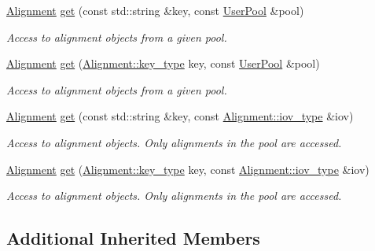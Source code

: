 \begin{DoxyCompactItemize}
\hyperlink{class_d_d4hep_1_1_alignments_1_1_alignment}{Alignment} \hyperlink{class_d_d4hep_1_1_alignments_1_1_det_align_a1487afd0d23a2ce523b29c7e502bf0bd}{get} (const std\+::string \&key, const \hyperlink{class_d_d4hep_1_1_alignments_1_1_det_align_a0595e4c0ee7f454cf5e9c5d32b718aca}{User\+Pool} \&pool)
\begin{DoxyCompactList}\small\item\em Access to alignment objects from a given pool. \end{DoxyCompactList}\item 
\hyperlink{class_d_d4hep_1_1_alignments_1_1_alignment}{Alignment} \hyperlink{class_d_d4hep_1_1_alignments_1_1_det_align_a25f066eaf3999061359f7a46fbd4cfe1}{get} (\hyperlink{class_d_d4hep_1_1_alignments_1_1_alignment_ab824a65f935a0c79b9ea1a7a85014b88}{Alignment\+::key\+\_\+type} key, const \hyperlink{class_d_d4hep_1_1_alignments_1_1_det_align_a0595e4c0ee7f454cf5e9c5d32b718aca}{User\+Pool} \&pool)
\begin{DoxyCompactList}\small\item\em Access to alignment objects from a given pool. \end{DoxyCompactList}\item 
\hyperlink{class_d_d4hep_1_1_alignments_1_1_alignment}{Alignment} \hyperlink{class_d_d4hep_1_1_alignments_1_1_det_align_aa009f405b4f76dadc3d6e8efae1f338d}{get} (const std\+::string \&key, const \hyperlink{class_d_d4hep_1_1_alignments_1_1_alignment_afd988c803da5a514d8fa255784f29462}{Alignment\+::iov\+\_\+type} \&iov)
\begin{DoxyCompactList}\small\item\em Access to alignment objects. Only alignments in the pool are accessed. \end{DoxyCompactList}\item 
\hyperlink{class_d_d4hep_1_1_alignments_1_1_alignment}{Alignment} \hyperlink{class_d_d4hep_1_1_alignments_1_1_det_align_af0a58378d82a0076222f0b9b7327f524}{get} (\hyperlink{class_d_d4hep_1_1_alignments_1_1_alignment_ab824a65f935a0c79b9ea1a7a85014b88}{Alignment\+::key\+\_\+type} key, const \hyperlink{class_d_d4hep_1_1_alignments_1_1_alignment_afd988c803da5a514d8fa255784f29462}{Alignment\+::iov\+\_\+type} \&iov)
\begin{DoxyCompactList}\small\item\em Access to alignment objects. Only alignments in the pool are accessed. \end{DoxyCompactList}\end{DoxyCompactItemize}
\subsection*{Additional Inherited Members}


